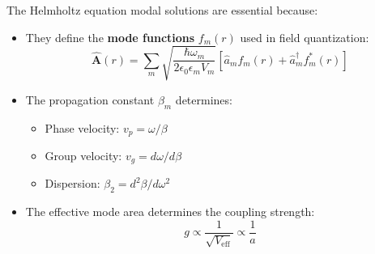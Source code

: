 \documentclass[12pt]{article}
\begin{document}
The Helmholtz equation modal solutions are essential because:

\begin{itemize}
\item They define the \textbf{mode functions} $f_m(r)$ used in field quantization:
\begin{equation}
\hat{\mathbf{A}}(r) = \sum_m \sqrt{\frac{\hbar \omega_m}{2\epsilon_0 \epsilon_m V_m}} \left[\hat{a}_m f_m(r) + \hat{a}_m^\dagger f_m^*(r)\right]
\end{equation}

\item The propagation constant $\beta_m$ determines:
\begin{itemize}
\item Phase velocity: $v_p = \omega/\beta$
\item Group velocity: $v_g = d\omega/d\beta$
\item Dispersion: $\beta_2 = d^2\beta/d\omega^2$
\end{itemize}

\item The effective mode area determines the coupling strength:
\begin{equation}
g \propto \frac{1}{\sqrt{V_{\text{eff}}}} \propto \frac{1}{a}
\end{equation}
\end{itemize}
\end{document}
